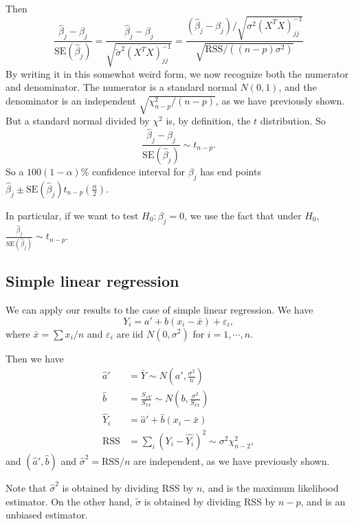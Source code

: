 \documentclass[a4paper]{article}
\begin{document}
Then
\[
  \frac{\hat{\beta}_j - \beta_j}{\mathrm{SE}(\hat{\beta}_j)} = \frac{\hat{\beta}_j - \beta_j}{\sqrt{\tilde{\sigma}^2(X^TX)^{-1}_{jj}}} = \frac{(\hat{\beta}_j - \beta_j)/\sqrt{\sigma^2(X^TX)_{jj}^{-1}}}{\sqrt{\mathrm{RSS}/((n - p)\sigma^2)}}
\]
By writing it in this somewhat weird form, we now recognize both the numerator and denominator. The numerator is a standard normal $N(0, 1)$, and the denominator is an independent $\sqrt{\chi^2_{n - p}/(n - p)}$, as we have previously shown. But a standard normal divided by $\chi^2$ is, by definition, the $t$ distribution. So
\[
  \frac{\hat{\beta}_j - \beta_j}{\mathrm{SE}(\hat{\beta}_j)} \sim t_{n - p}.
\]
So a $100(1 - \alpha)\%$ confidence interval for $\beta_j$ has end points $\hat{\beta}_j\pm \mathrm{SE}(\hat{\beta}_j)t_{n - p}(\frac{\alpha}{2})$.

In particular, if we want to test $H_0: \beta_j = 0$, we use the fact that under $H_0$, $\frac{\hat{\beta}_j}{\mathrm{SE}(\hat{\beta}_j)} \sim t_{n - p}$.

\subsection{Simple linear regression}
We can apply our results to the case of simple linear regression. We have
\[
  Y_i = a' + b(x_i - \bar x) + \varepsilon_i,
\]
where $\bar x = \sum x_i/n$ and $\varepsilon_i$ are iid $N(0, \sigma^2)$ for $i = 1, \cdots, n$.

Then we have
\begin{align*}
  \hat{a}' &= \bar Y \sim N\left(a', \frac{\sigma^2}{n}\right)\\
  \hat{b} &= \frac{S_{xY}}{S_{xx}}\sim N\left(b, \frac{\sigma^2}{S_{xx}}\right)\\
  \hat{Y}_i &= \hat{a}' + \hat{b}(x_i - \bar x)\\
  \mathrm{RSS} &= \sum_i (Y_i - \hat{Y_i})^2 \sim \sigma^2 \chi_{n - 2}^2,
\end{align*}
and $(\hat{a}', \hat{b})$ and $\hat{\sigma}^2 = \mathrm{RSS}/n$ are independent, as we have previously shown.

Note that $\hat{\sigma}^2$ is obtained by dividing RSS by $n$, and is the maximum likelihood estimator. On the other hand, $\tilde{\sigma}$ is obtained by dividing RSS by $n - p$, and is an unbiased estimator.
\end{document}
